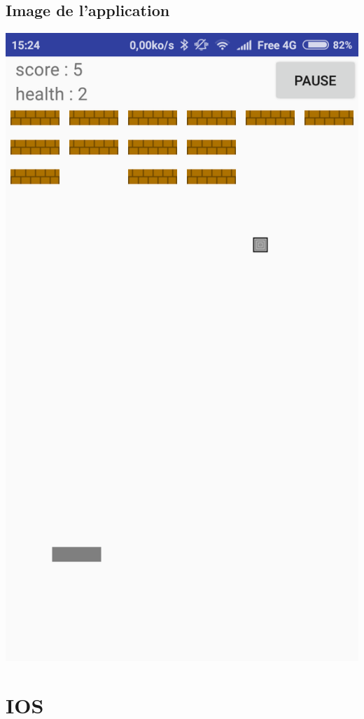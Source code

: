 \documentclass[a4paper]{article}
\begin{document}
\subsection{Image de l'application}
\begin{center}
\includegraphics[scale=0.25]{android.png}
\end{center}
\pagebreak

\section{IOS}
\end{document}
